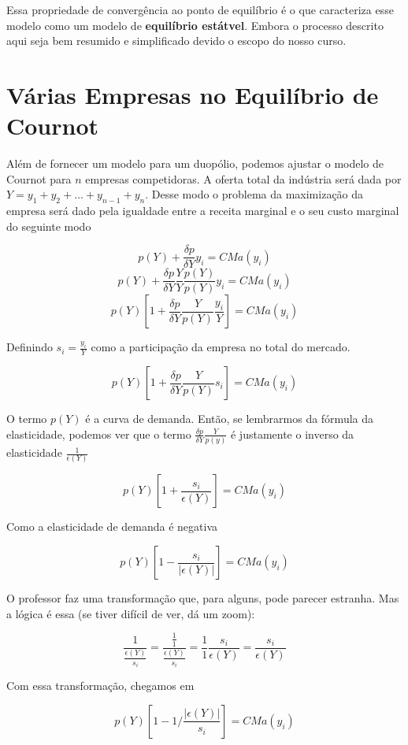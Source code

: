 \documentclass[a4paper,11pt,oneside]{book}
\theoremstyle{definition}
\theoremstyle{break}
\begin{document}
Essa propriedade de convergência ao ponto de equilíbrio é o que caracteriza esse modelo como um modelo de \textbf{equilíbrio estátvel}. Embora o processo descrito aqui seja bem resumido e simplificado devido o escopo do nosso curso.

\section{Várias Empresas no Equilíbrio de Cournot}

Além de fornecer um modelo para um duopólio, podemos ajustar o modelo de Cournot para $n$ empresas competidoras. A oferta total da indústria será dada por $Y = y_1 + y_2 + \dots + y_{n-1} + y_n$. Desse modo o problema da maximização da empresa será dado pela igualdade entre a receita marginal e o seu custo marginal do seguinte modo

$$ p(Y) + \frac{\delta p}{\delta Y} y_i = CMa(y_i) $$
$$ p(Y) + \frac{\delta p}{\delta Y} \frac{Y}{Y} \frac{p(Y)}{p(Y)} y_i = CMa(y_i) $$
$$ p(Y) \left[1 + \frac{\delta p}{\delta Y} \frac{Y}{p(Y)} \frac{y_i}{Y} \right] = CMa(y_i) $$

Definindo $s_i = \frac{y_i}{Y}$ como a participação da empresa no total do mercado.

$$ p(Y) \left[1 + \frac{\delta p}{\delta Y} \frac{Y}{p(Y)} s_i \right] = CMa(y_i) $$

O termo $p(Y)$ é a curva de demanda. Então, se lembrarmos da fórmula da elasticidade, podemos ver que o termo $\frac{\delta p}{\delta Y} \frac{Y}{p(y)}$ é justamente o inverso da elasticidade $\frac{1}{\epsilon(Y)}$

$$ p(Y) \left[1 + \frac{s_i}{\epsilon(Y)} \right] = CMa(y_i) $$

Como a elasticidade de demanda é negativa

$$ p(Y) \left[1 - \frac{s_i}{|\epsilon(Y)|} \right] = CMa(y_i) $$

O professor faz uma transformação que, para alguns, pode parecer estranha. Mas a lógica é essa (se tiver difícil de ver, dá um zoom):

$$ \frac{1}{\frac{\epsilon(Y)}{s_i}} = \frac{\frac{1}{1}}{\frac{\epsilon(Y)}{s_i}} = \frac{1}{1} \frac{s_i}{\epsilon(Y)} = \frac{s_i}{\epsilon(Y)} $$

Com essa transformação, chegamos em

$$ p(Y) \left[1 - 1/\frac{|\epsilon(Y)|}{s_i} \right] = CMa(y_i) $$
\end{document}
